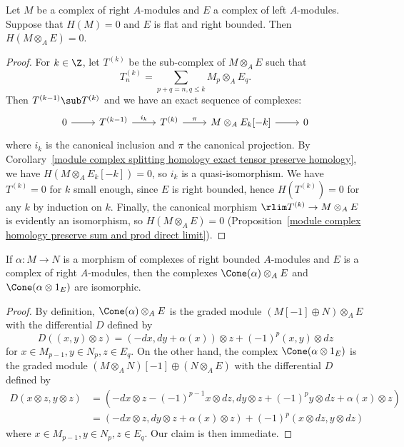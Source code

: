 \begin{lemma}\label{module complex tensor with positive flat preserve exact}
Let $M$ be a complex of right $A$-modules and $E$ a complex of left $A$-modules. Suppose that $H(M)=0$ and $E$ is flat and right bounded. Then $H(M\otimes_AE)=0$.
\end{lemma}
\begin{proof}
For $k\in\Z$, let $T^{(k)}$ be the sub-complex of $M\otimes_AE$ such that
\[T_n^{(k)}=\sum_{p+q=n,q\leq k}M_p\otimes_AE_q.\]
Then $T^{(k-1)}\sub T^{(k)}$ and we have an exact sequence of complexes:
\[\begin{tikzcd}
0\ar[r]&T^{(k-1)}\ar[r,"i_k"]&T^{(k)}\ar[r,"\pi"]&M\otimes_AE_k[-k]\ar[r]&0
\end{tikzcd}\]
where $i_k$ is the canonical inclusion and $\pi$ the canonical projection. By Corollary~\ref{module complex splitting homology exact tensor preserve homology}, we have $H(M\otimes_AE_k[-k])=0$, so $i_k$ is a quasi-isomorphism. We have $T^{(k)}=0$ for $k$ small enough, since $E$ is right bounded, hence $H(T^{(k)})=0$ for any $k$ by induction on $k$. Finally, the canonical morphism $\rlim T^{(k)}\to M\otimes_AE$ is evidently an isomorphism, so $H(M\otimes_AE)=0$ (Proposition~\ref{module complex homology preserve sum and prod direct limit}).
\end{proof}
\begin{lemma}\label{module complex tensor with positive flat preserve cone}
If $\alpha:M\to N$ is a morphism of complexes of right bounded $A$-modules and $E$ is a complex of right $A$-modules, then the complexes $\Cone(\alpha)\otimes_AE$ and $\Cone(\alpha\otimes 1_E)$ are isomorphic.
\end{lemma}
\begin{proof}
By definition, $\Cone(\alpha)\otimes_AE$ is the graded module $(M[-1]\oplus N)\otimes_AE$ with the differential $D$ defined by
\[D((x,y)\otimes z)=(-dx,dy+\alpha(x))\otimes z+(-1)^p(x,y)\otimes dz\]
for $x\in M_{p-1},y\in N_p,z\in E_q$. On the other hand, the complex $\Cone(\alpha\otimes 1_E)$ is the graded module $(M\otimes_AN)[-1]\oplus(N\otimes_AE)$ with the differential $D$ defined by
\begin{align*}
D(x\otimes z,y\otimes z)&=(-dx\otimes z-(-1)^{p-1}x\otimes dz,dy\otimes z+(-1)^py\otimes dz+\alpha(x)\otimes z)\\
&=(-dx\otimes z,dy\otimes z+\alpha(x)\otimes z)+(-1)^p(x\otimes dz,y\otimes dz)
\end{align*}
where $x\in M_{p-1},y\in N_p,z\in E_q$. Our claim is then immediate.
\end{proof}
